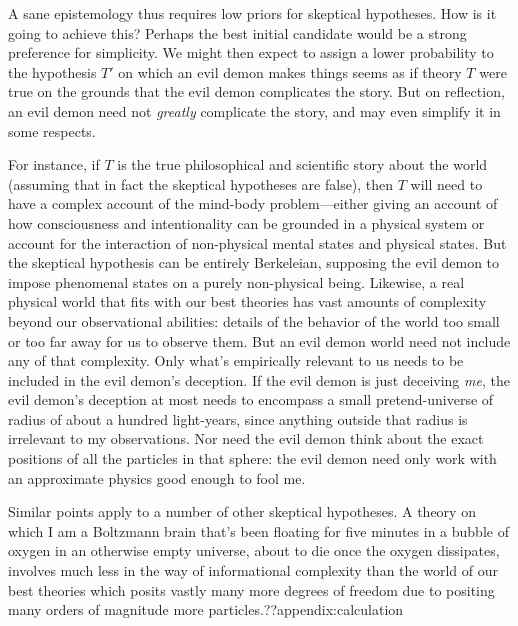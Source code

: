 A sane epistemology thus requires low priors for skeptical hypotheses. How is it going to achieve this?
Perhaps the best initial candidate would be a strong preference for simplicity. We might then expect to assign a lower probability to the hypothesis $T'$ 
on which an evil demon makes things seems as if theory $T$ were true on the grounds that the evil demon complicates 
the story. But on reflection, an evil demon need not \textit{greatly} complicate the story, and may even simplify it 
in some respects.

For instance, if $T$ is the true philosophical and scientific story about the world (assuming that in fact
the skeptical hypotheses are false), then $T$ will need to have a complex account of the mind-body problem---either 
giving an account of how consciousness and intentionality can be grounded in a physical system or account for
the interaction of non-physical mental states and physical states. But the skeptical hypothesis can be entirely
Berkeleian, supposing the evil demon to impose phenomenal states on a purely non-physical being. Likewise, 
a real physical world that fits with our best theories has vast amounts of complexity beyond our observational
abilities: details of the behavior of the world too small or too far away for us to observe them. But an 
evil demon world need not include any of that complexity. Only what's empirically relevant to us needs to be included 
in the evil demon's deception. If the evil demon is just deceiving \textit{me}, the evil demon's deception at most 
needs to encompass a small pretend-universe of radius of about a hundred light-years, since anything outside that radius is
irrelevant to my observations. Nor need the evil demon think about the exact positions of all the particles in that sphere:
the evil demon need only work with an approximate physics good enough to fool me. 

Similar points apply to a number of other skeptical hypotheses. A theory on which I am a Boltzmann brain that's been 
floating for five minutes in a bubble of oxygen in an otherwise empty universe, about to die once the oxygen
dissipates, involves much less in the way of informational complexity than the world of our best theories which posits
vastly many more degrees of freedom due to positing many orders of magnitude more particles.??appendix:calculation

